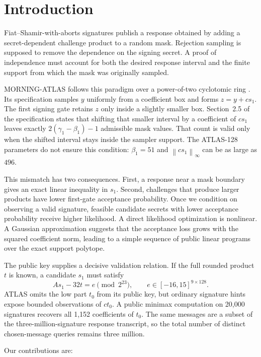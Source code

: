 \documentclass[11pt,a4paper]{article}
\newcommand{\norm}[1]{\left\lVert #1\right\rVert}
\begin{document}
\section{Introduction}

Fiat--Shamir-with-aborts signatures publish a response obtained by adding a
secret-dependent challenge product to a random mask.  Rejection sampling is
supposed to remove the dependence on the signing secret.  A proof of
independence must account for both the desired response interval and the
finite support from which the mask was originally sampled.

MORNING-ATLAS follows this paradigm over a power-of-two cyclotomic ring
\cite{ATLAS}.  Its specification samples $y$ uniformly from a coefficient
box and forms $z=y+cs_1$.  The first signing gate retains $z$ only inside a
slightly smaller box.  Section~2.5 of the specification states that shifting
that smaller interval by a coefficient of $cs_1$ leaves exactly
$2(\gamma_1-\beta_1)-1$ admissible mask values.  That count is valid only when
the shifted interval stays inside the sampler support.  The ATLAS-128
parameters do not ensure this condition: $\beta_1=51$ and
$\norm{cs_1}_\infty$ can be as large as $496$.

This mismatch has two consequences.  First, a response near a mask boundary
gives an exact linear inequality in $s_1$.  Second, challenges that produce
larger products have lower first-gate acceptance probability.  Once we
condition on observing a valid signature, feasible candidate secrets with
lower acceptance probability receive higher likelihood.  A direct likelihood
optimization is nonlinear.  A Gaussian approximation suggests that the
acceptance loss grows with the squared coefficient norm, leading to a simple
sequence of public linear programs over the exact support polytope.

The public key supplies a decisive validation relation.  If the full rounded
product $t$ is known, a candidate $s_1$ must satisfy
\[
            A s_1-32t=e\pmod{2^{23}},
            \qquad e\in[-16,15]^{9\times128}.
\]
ATLAS omits the low part $t_0$ from its public key, but ordinary signature
hints expose bounded observations of $ct_0$.  A public minimax computation on
20,000 signatures recovers all 1,152 coefficients of $t_0$.  The same
messages are a subset of the three-million-signature response transcript, so
the total number of distinct chosen-message queries remains three million.

Our contributions are:
\end{document}

